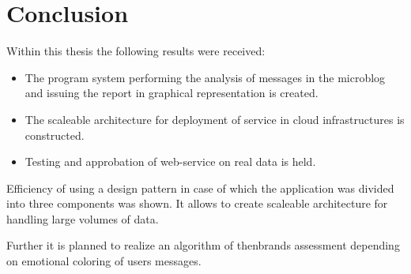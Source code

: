 \section{Conclusion}

Within this thesis the following results were received:

\begin {itemize}
\item The program system performing the analysis of messages in the microblog and issuing the report in graphical representation is created.
\item The scaleable architecture for deployment of service in cloud infrastructures is constructed.
\item Testing and approbation of web-service on real data is held.
\end {itemize}

Efficiency of using a design pattern in case of which the application was divided into three components was shown. It allows to create scaleable architecture for handling large volumes of data.

Further it is planned to realize an algorithm of thenbrands assessment depending on emotional coloring of users messages.